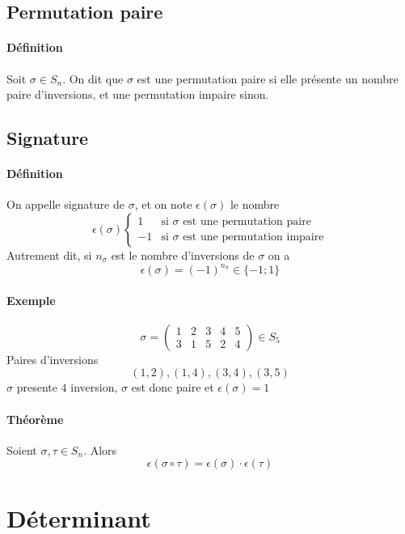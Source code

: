 %
\subsection{Permutation paire}
%
\paragraph{Définition} Soit $\sigma \in S_n$. On dit que $\sigma$ est une permutation paire si elle présente un nombre paire d'inversions, et une permutation impaire sinon.

%
\subsection{Signature}
%
\paragraph{Définition} On appelle signature de $\sigma$, et on note $\epsilon(\sigma)$ le nombre
$$\epsilon(\sigma) \left\{ \begin{array}{lr} 1 & \text{si } \sigma \text{ est une permutation paire} \\ -1 & \text{si } \sigma \text{ est une permutation impaire} \end{array}$$
Autrement dit, si $n_{\sigma}$ est le nombre d'inversions de $\sigma$ on a
$$\epsilon(\sigma) = (-1)^{n_{\sigma}} \in \{-1; 1\}$$

\paragraph{Exemple}
$$\sigma = \begin{pmatrix} 1 & 2 & 3 & 4 & 5 \\ 3 & 1 & 5 & 2 & 4 \end{pmatrix} \in S_5$$
Paires d'inversions
$$(1, 2), (1, 4), (3, 4), (3, 5)$$
$\sigma$ presente $4$ inversion, $\sigma$ est donc paire et $\epsilon(\sigma) = 1$

\paragraph{Théorème} Soient $\sigma, \tau \in S_n$. Alors
$$\epsilon(\sigma \circ \tau) = \epsilon(\sigma) \cdot \epsilon(\tau)$$

%
%
\section{Déterminant}
%
%

